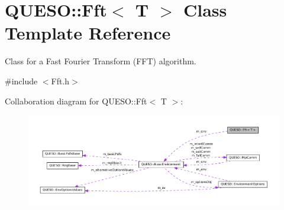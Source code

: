 \hypertarget{class_q_u_e_s_o_1_1_fft}{\section{Q\-U\-E\-S\-O\-:\-:Fft$<$ T $>$ Class Template Reference}
\label{class_q_u_e_s_o_1_1_fft}
}


Class for a Fast Fourier Transform (F\-F\-T) algorithm.  




{\ttfamily \#include $<$Fft.\-h$>$}



Collaboration diagram for Q\-U\-E\-S\-O\-:\-:Fft$<$ T $>$\-:
\nopagebreak
\begin{figure}[H]
\begin{center}
\leavevmode
\includegraphics[width=350pt]{class_q_u_e_s_o_1_1_fft__coll__graph}
\end{center}
\end{figure}
